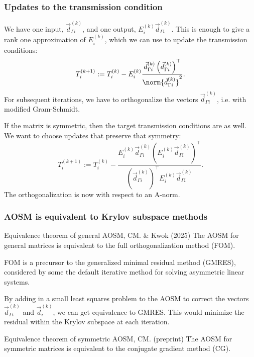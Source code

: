 \documentclass[10pt]{beamer}
\begin{document}
\begin{frame}
\frametitle{Updates to the transmission condition}

We have one input, $\vec{d}_{\Gamma i}^{(k)}$, and one output, $E_i^{(k)} \vec{d}_{\Gamma i}^{(k)}$.
This is enough to give a rank one approximation of $E_i^{(k)}$, which we can use to update the transmission conditions:
\begin{equation*}
	T_i^{(k+1)} := T_i^{(k)} - E_i^{(k)} \frac{\vec{d}_{\Gamma i}^{(k)} \left ( \vec{d}_{\Gamma i}^{(k)} \right )^\top}{\norm{\vec{d}_{\Gamma i}^{(k)}}^2}.
\end{equation*}
For subsequent iterations, we have to orthogonalize the vectors $\vec{d}_{\Gamma i}^{(k)}$, i.e. with modified Gram-Schmidt.

If the matrix is symmetric, then the target transmission conditions are as well.
We want to choose updates that preserve that symmetry:
\begin{equation*}
	T_i^{(k+1)} := T_i^{(k)} - \frac{E_i^{(k)} \vec{d}_{\Gamma i}^{(k)} \left ( E_i^{(k)} \vec{d}_{\Gamma i}^{(k)} \right )^\top}{\left ( \vec{d}_{\Gamma i}^{(k)} \right )^\top E_i^{(k)} \vec{d}_{\Gamma i}^{(k)}} .
\end{equation*}
The orthogonalization is now with respect to an A-norm.

\end{frame}

\begin{frame}
\frametitle{AOSM is equivalent to Krylov subspace methods}

\begin{block}{Equivalence theorem of general AOSM, CM. \& Kwok (2025)}
The AOSM for general matrices is equivalent to the full orthogonalization method (FOM).
\end{block}

FOM is a precursor to the generalized minimal residual method (GMRES), considered by some the default iterative method for solving asymmetric linear systems.

By adding in a small least squares problem to the AOSM to correct the vectors $\vec{d}_{\Gamma i}^{(k)}$ and $\vec{d}_i^{(k)}$, we can get equivalence to GMRES.
This would minimize the residual within the Krylov subspace at each iteration.

\begin{block}{Equivalence theorem of symmetric AOSM, CM. (preprint)}
The AOSM for symmetric matrices is equivalent to the conjugate gradient method (CG).
\end{block}

\end{frame}
\end{document}
